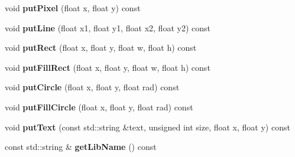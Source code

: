 \begin{DoxyCompactItemize}
void {\bfseries put\+Pixel} (float x, float y) const
\item 
\mbox{\label{class_ncurses_module_a707194408b72b1a32619d875f2c2ed71}} 
void {\bfseries put\+Line} (float x1, float y1, float x2, float y2) const
\item 
\mbox{\label{class_ncurses_module_a18bda2228b97d84090a32893fc810e27}} 
void {\bfseries put\+Rect} (float x, float y, float w, float h) const
\item 
\mbox{\label{class_ncurses_module_ad1282d6381de2eebe7d77f8a6e5c4eb7}} 
void {\bfseries put\+Fill\+Rect} (float x, float y, float w, float h) const
\item 
\mbox{\label{class_ncurses_module_af88ec14604e5f0da223761ac6035b58b}} 
void {\bfseries put\+Circle} (float x, float y, float rad) const
\item 
\mbox{\label{class_ncurses_module_a0fddce959fe6b029e66233197e6f0899}} 
void {\bfseries put\+Fill\+Circle} (float x, float y, float rad) const
\item 
\mbox{\label{class_ncurses_module_acf338166a4a099f90eee3406c151b811}} 
void {\bfseries put\+Text} (const std\+::string \&text, unsigned int size, float x, float y) const
\item 
\mbox{\label{class_ncurses_module_ad632f93231a43ef2d10eea057286025b}} 
const std\+::string \& {\bfseries get\+Lib\+Name} () const
\end{DoxyCompactItemize}
